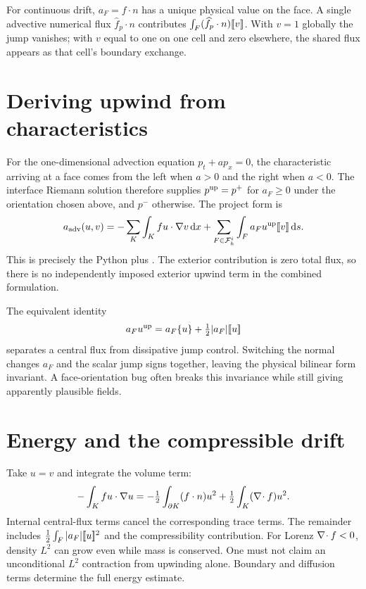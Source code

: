 For continuous drift, $a_F=f\cdot n$ has a unique physical value on the face. A single advective numerical flux $\widehat f_p\cdot n$ contributes $\int_F(\widehat f_p\cdot n)[\![v]\!]$. With $v=1$ globally the jump vanishes; with $v$ equal to one on one cell and zero elsewhere, the shared flux appears as that cell's boundary exchange.

\section{Deriving upwind from characteristics}
For the one-dimensional advection equation $p_t+ap_x=0$, the characteristic arriving at a face comes from the left when $a>0$ and the right when $a<0$. The interface Riemann solution therefore supplies $p^{\rm up}=p^+$ for $a_F\ge0$ under the orientation chosen above, and $p^-$ otherwise. The project form is
\begin{equation}\label{eq:adv-form}
a_{\rm adv}(u,v)=-\sum_K\int_Kfu\cdot\nabla v\,\mathrm d x
+\sum_{F\in\mathcal F_h^i}\int_Fa_Fu^{\rm up}[\![v]\!]\,\mathrm d s.
\end{equation}
This is precisely the Python  plus . The exterior contribution is zero total flux, so there is no independently imposed exterior upwind term in the combined formulation.

The equivalent identity
\begin{equation}
a_Fu^{\rm up}=a_F\{u\}+\tfrac12|a_F|[\![u]\!]
\end{equation}
separates a central flux from dissipative jump control. Switching the normal changes $a_F$ and the scalar jump signs together, leaving the physical bilinear form invariant. A face-orientation bug often breaks this invariance while still giving apparently plausible fields.

\section{Energy and the compressible drift}
Take $u=v$ and integrate the volume term:
\begin{equation}
-\int_Kfu\cdot\nabla u=-\tfrac12\int_{\partial K}(f\cdot n)u^2+\tfrac12\int_K(\nabla\!\cdot f)u^2.
\end{equation}
Internal central-flux terms cancel the corresponding trace terms. The remainder includes $\frac12\int_F|a_F|[\![u]\!]^2$ and the compressibility contribution. For Lorenz $\nabla\!\cdot f<0$, density $L^2$ can grow even while mass is conserved. One must not claim an unconditional $L^2$ contraction from upwinding alone. Boundary and diffusion terms determine the full energy estimate.

